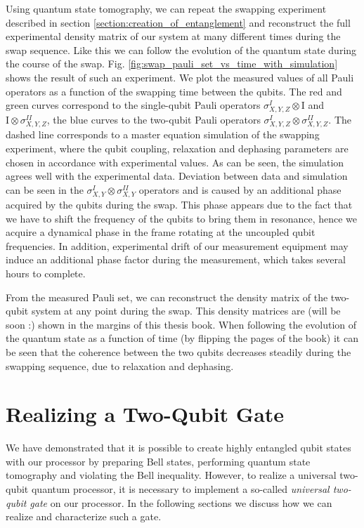 Using quantum state tomography, we can repeat the swapping experiment described in section \ref{section:creation_of_entanglement} and reconstruct the full experimental density matrix of our system at many different times during the swap sequence. Like this we can follow the evolution of the quantum state during the course of the swap. Fig. \ref{fig:swap_pauli_set_vs_time_with_simulation} shows the result of such an experiment. We plot the measured values of all Pauli operators as a function of the swapping time between the qubits. The red and green curves correspond to the single-qubit Pauli operators $\sigma^I_{X,Y,Z}\otimes \mathrm{I}$ and $\mathrm{I}\otimes \sigma^{II}_{X,Y,Z}$, the blue curves to the two-qubit Pauli operators $\sigma_{X,Y,Z}^I\otimes \sigma_{X,Y,Z}^{II}$. The dashed line corresponds to a master equation simulation of the swapping experiment, where the qubit coupling, relaxation and dephasing parameters are chosen in accordance with experimental values. As can be seen, the simulation agrees well with the experimental data. Deviation between data and simulation can be seen in the $\sigma_{X,Y}^I\otimes \sigma_{X,Y}^{II}$ operators and is caused by an additional phase acquired by the qubits during the swap. This phase appears due to the fact that we have to shift the frequency of the qubits to bring them in resonance, hence we acquire a dynamical phase in the frame rotating at the uncoupled qubit frequencies. In addition, experimental drift of our measurement equipment may induce an additional phase factor during the measurement, which takes several hours to complete.

\smallskip

From the measured Pauli set, we can reconstruct the density matrix of the two-qubit system at any point during the swap. This density matrices are (will be soon :) shown in the margins of this thesis book. When following the evolution of the quantum state as a function of time (by flipping the pages of the book) it can be seen that the coherence between the two qubits decreases steadily during the swapping sequence, due to relaxation and dephasing.

\section{Realizing a Two-Qubit Gate}

We have demonstrated that it is possible to create highly entangled qubit states with our processor by preparing Bell states, performing quantum state tomography and violating the Bell inequality. However, to realize a universal two-qubit quantum processor, it is necessary to implement a so-called {\it universal two-qubit gate} on our processor. In the following sections we discuss how we can realize and characterize such a gate.

